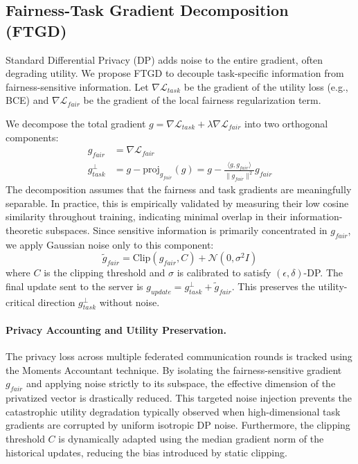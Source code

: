 \documentclass[pmlr]{jmlr}%
\begin{document}
\subsection{Fairness-Task Gradient Decomposition (FTGD)}
Standard Differential Privacy (DP) adds noise to the entire gradient, often degrading utility. We propose FTGD to decouple task-specific information from fairness-sensitive information. Let $\nabla \mathcal{L}_{task}$ be the gradient of the utility loss (e.g., BCE) and $\nabla \mathcal{L}_{fair}$ be the gradient of the local fairness regularization term.

We decompose the total gradient $g = \nabla \mathcal{L}_{task} + \lambda \nabla \mathcal{L}_{fair}$ into two orthogonal components:
\begin{align}
g_{fair} &= \nabla \mathcal{L}_{fair} \label{eq:gfair}\\
g_{task}^{\perp} &= g - \text{proj}_{g_{fair}}(g) = g - \frac{\langle g, g_{fair}\rangle}{\|g_{fair}\|^2} g_{fair} \label{eq:gtaskperp}
\end{align}
The decomposition assumes that the fairness and task gradients are meaningfully separable. In practice, this is empirically validated by measuring their low cosine similarity throughout training, indicating minimal overlap in their information-theoretic subspaces. Since sensitive information is primarily concentrated in $g_{fair}$, we apply Gaussian noise only to this component:
\begin{equation}
\tilde{g}_{fair} = \text{Clip}(g_{fair}, C) + \mathcal{N}(0, \sigma^2 I)
\label{eq:ftgd_noise}
\end{equation}
where $C$ is the clipping threshold and $\sigma$ is calibrated to satisfy $(\epsilon,\delta)$-DP. The final update sent to the server is $g_{update} = g_{task}^{\perp} + \tilde{g}_{fair}$. This preserves the utility-critical direction $g_{task}^{\perp}$ without noise.

\paragraph{Privacy Accounting and Utility Preservation.}
The privacy loss across multiple federated communication rounds is tracked using the Moments Accountant technique. By isolating the fairness-sensitive gradient $g_{fair}$ and applying noise strictly to its subspace, the effective dimension of the privatized vector is drastically reduced. This targeted noise injection prevents the catastrophic utility degradation typically observed when high-dimensional task gradients are corrupted by uniform isotropic DP noise. Furthermore, the clipping threshold $C$ is dynamically adapted using the median gradient norm of the historical updates, reducing the bias introduced by static clipping.
\end{document}
